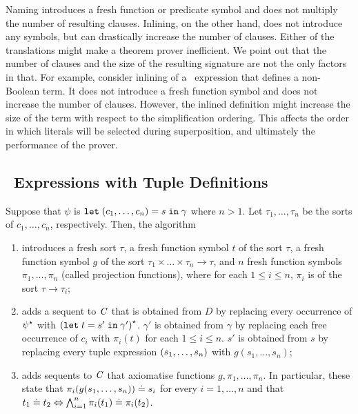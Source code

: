 Naming introduces a fresh function or predicate symbol and does not multiply the number of resulting clauses. Inlining, on the other hand, does not introduce any symbols, but can drastically increase the number of clauses. Either of the translations might make a theorem prover inefficient. We point out that the number of clauses and the size of the resulting signature are not the only factors in that. For example, consider inlining of a \LETIN\ expression that defines a non-Boolean term. It does not introduce a fresh function symbol and does not increase the number of clauses. However, the inlined definition might increase the size of the term with respect to the simplification ordering. This affects the order in which literals will be selected during superposition, and ultimately the performance of the prover.


\subsection*{\LETIN\ Expressions with Tuple Definitions}
Suppose that $\psi$ is $\mathtt{let}\;{({c_1,\ldots,c_n})}={s}\;\allowbreak\mathtt{in}\;{\gamma}$ where $n > 1$. Let $\tau_1,\ldots,\tau_n$ be the sorts of $c_1,\ldots,c_n$, respectively. Then, 
the \nfcnf{} algorithm 
\begin{enumerate}
  \item introduces a fresh sort $\tau$, a fresh function symbol $t$ of the sort $\tau$, a fresh function symbol $g$ of the sort $\tau_1\times\ldots\times\tau_n\to\tau$, and $n$ fresh function symbols $\pi_1,\ldots,\pi_n$ (called projection functions), where for each $1 \le i \le n$, $\pi_i$ is of the sort $\tau \to \tau_i$;
  \item adds a sequent to $\mathit{C}$ that is obtained from $D$ by replacing every occurrence of ${\psi}^{\star}$ with ${(\mathtt{let}\;{t}={s'}\;\allowbreak\mathtt{in}\;{\gamma'})}^{\star}$. $\gamma'$ is obtained from $\gamma$ by replacing each free occurrence of $c_i$ with $\pi_i(t)$ for each $1 \le i \le n$. $s'$ is obtained from $s$ by replacing every tuple expression $({s_1,\ldots,s_n})$ with $g(s_1,\ldots,s_n)$;
  \item adds sequents to $\mathit{C}$ that axiomatise functions $g,\pi_1,\ldots,\pi_n$. In particular, these state
  that $\pi_i(g(s_1,\ldots,s_n)) \doteq s_i$ for every $i=1,\ldots, n$ and that $t_1 \doteq t_2 \Leftrightarrow \bigwedge_{i=1}^n \pi_i(t_1) \doteq \pi_i(t_2)$.
\end{enumerate} 

